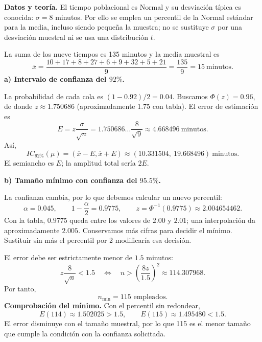 \textbf{Datos y teoría.} El tiempo poblacional es Normal y su desviación típica es conocida: $\sigma=8$ minutos. Por ello se emplea un percentil de la Normal estándar para la media, incluso siendo pequeña la muestra; no se sustituye $\sigma$ por una desviación muestral ni se usa una distribución $t$.

La suma de los nueve tiempos es 135 minutos y la media muestral es
\[
\overline x=\frac{10+17+8+27+6+9+32+5+21}{9}=\frac{135}{9}=15\ \text{minutos}.
\]
\textbf{a) Intervalo de confianza del $92\%$.}\par\nopagebreak[4]

La probabilidad de cada cola es $(1-0.92)/2=0.04$. Buscamos $\Phi(z)=0.96$, de donde $z\approx1.750686$ (aproximadamente $1.75$ con tabla). El error de estimación es
\[
E=z\frac\sigma{\sqrt n}=1.750686\ldots\frac8{\sqrt9}
\approx4.668496\ \text{minutos}.
\]
Así,
\[
IC_{92\%}(\mu)=\left(\overline x-E,\overline x+E\right)
\approx\boxed{(10.331504,\ 19.668496)\ \text{minutos}}.
\]
El semiancho es $E$; la amplitud total sería $2E$.

\textbf{b) Tamaño mínimo con confianza del $95.5\%$.}\par\nopagebreak[4]

La confianza cambia, por lo que debemos calcular un nuevo percentil:
\[
\alpha=0.045,\qquad 1-\frac\alpha2=0.9775,
\qquad z=\Phi^{-1}(0.9775)\approx2.004654462.
\]
Con la tabla, $0.9775$ queda entre los valores de $2.00$ y $2.01$; una interpolación da aproximadamente $2.005$. Conservamos más cifras para decidir el mínimo. Sustituir sin más el percentil por 2 modificaría esa decisión.

El error debe ser estrictamente menor de $1.5$ minutos:
\[
z\frac8{\sqrt n}<1.5
\quad\Longleftrightarrow\quad
n>\left(\frac{8z}{1.5}\right)^2
\approx114.307968.
\]
Por tanto,
\[
\boxed{n_{\min}=115\text{ empleados}.}
\]
\textbf{Comprobación del mínimo.} Con el percentil sin redondear,
\[
E(114)\approx1.502025>1.5,\qquad
E(115)\approx1.495480<1.5.
\]
El error disminuye con el tamaño muestral, por lo que 115 es el menor tamaño que cumple la condición con la confianza solicitada.
